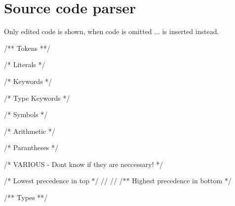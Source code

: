 \documentclass[10pt]{article}
\begin{document}
\section{Source code parser}
Only edited code is shown, when code is omitted $\ldots$ is inserted instead.
\begin{fancycode}[frame=lines,fontsize=\scriptsize,label=\textit{edited code - SRC/Parser.grm - }]
/** Tokens **/

/* Literals */

/* Keywords */

/* Type Keywords */

/* Symbols */

/* Arithmetic */

/* Parantheses */

/* VARIOUS - Dont know if they are neccessary! */


/* Lowest precedence in top */
//%
//%
/** Highest precedence in bottom */

/** Types **/



\end{fancycode}
\end{document}
